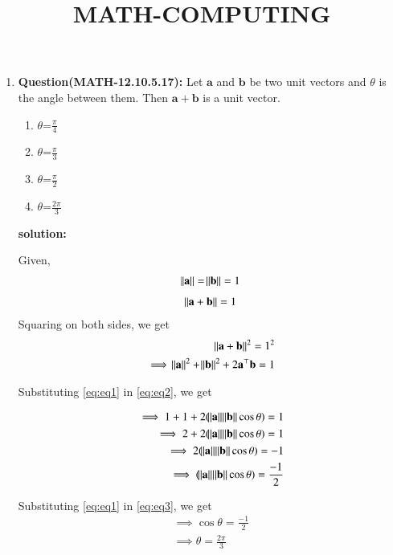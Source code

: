 \documentclass[12pt,-letter paper]{article}
\let\vec\mathbf{}
\let\vec\mathbf{}
\let\vec\mathbf{}
\begin{document}
\title{\textbf{MATH-COMPUTING}}
\maketitle
\begin{enumerate}
 
    \item \textbf{Question(MATH-12.10.5.17):}
       Let $\vec{a}$ and $\vec{b}$ be two unit vectors and $\theta$ is the angle between them. Then $\vec{a}+\vec{b}$ is a unit vector.
    
 \begin{enumerate}[label=(\Alph*)]                     
 \item $\theta$=$\frac{\pi}{4}$
 \item $\theta$=$\frac{\pi}{3}$
  \item $\theta$=$\frac{\pi}{2}$
   \item $\theta$=$\frac{2\pi}{3}$
   \end{enumerate}

 \textbf{solution:}

Given,
\begin{align}
	\norm{\vec{a}} = \norm{\vec{b}}=1 
 \label{eq:eq1}
  \end{align}
 \begin{align}
	\norm{\vec{a}+\vec{b}}=1
 \end{align}
Squaring on both sides, we get
\begin{align}
	\norm{\vec{a}+\vec{b}}^2=1^2
\\	
	\implies \norm{\vec{a}}^2 + \norm{\vec{b}}^2 + 2\vec{a}^{\top}\vec{b} = 1
 \label{eq:eq2}
\end{align}

Substituting \eqref{eq:eq1} in \eqref{eq:eq2}, we get

\begin{align}
	\implies 1+1+2(\norm{\vec{a}}\norm{\vec{b}}\cos{\theta})=1
	\\
	\implies 2+2(\norm{\vec{a}}\norm{\vec{b}}\cos{\theta})=1
        \\
	\implies 2(\norm{\vec{a}}\norm{\vec{b}}\cos{\theta})=-1
	\\
	\implies (\norm{\vec{a}}\norm{\vec{b}}\cos{\theta})=\frac{-1}{2}
 \label{eq:eq3}
\end{align}

Substituting \eqref{eq:eq1} in \eqref{eq:eq3}, we get
\begin{align}
	\implies \cos{\theta}=\frac{-1}{2}
	\\
	\implies \theta=\frac{2\pi}{3}
\end{align}


\end{enumerate}
\end{document}
